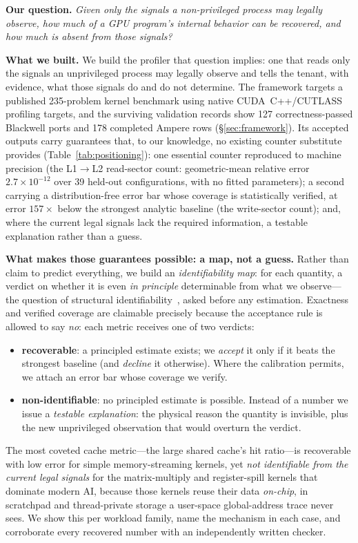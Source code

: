 \documentclass[conference]{IEEEtran}
\newcommand{\rec}{\textcolor{recblue}{\textbf{recoverable}}}
\newcommand{\non}{\textcolor{noid}{\textbf{non-identifiable}}}
\begin{document}
\smallskip
\noindent\textbf{Our question.} \emph{Given only the signals a non-privileged
process may legally observe, how much of a GPU program's internal behavior can
be recovered, and how much is absent from those signals?}

\smallskip
\noindent\textbf{What we built.} We build the profiler that question implies:
one that reads only the signals an unprivileged process may legally observe
and tells the tenant, with evidence, what those signals do and do not
determine. The framework targets a published 235-problem kernel benchmark
using native CUDA~C++/CUTLASS profiling targets, and the surviving
validation records show 127 correctness-passed Blackwell ports and 178 completed Ampere
rows (\S\ref{sec:framework}). Its accepted outputs carry guarantees that, to
our knowledge, no existing counter substitute provides (Table~\ref{tab:positioning}):
one essential counter reproduced to machine precision (the
L1$\rightarrow$L2 read-sector count: geometric-mean relative error
$2.7\times10^{-12}$ over 39 held-out configurations, with no fitted
parameters); a second carrying a distribution-free error bar whose coverage
is statistically verified, at error $157\times$ below the strongest analytic
baseline (the write-sector count); and, where the current legal signals lack
the required information, a testable explanation rather than a guess.

\smallskip
\noindent\textbf{What makes those guarantees possible: a map, not a guess.}
Rather than claim to predict
everything, we build an \emph{identifiability map}: for each quantity, a verdict
on whether it is even \emph{in principle} determinable from what we observe---the
question of structural
identifiability~\cite{villaverde2016structural}, asked
before any estimation. Exactness and verified coverage are claimable
precisely because the acceptance rule is allowed to say \emph{no}: each
metric receives one of two verdicts:
\begin{itemize}
\item \rec: a principled estimate exists; we \emph{accept} it only if it
beats the strongest baseline (and \emph{decline} it otherwise). Where the
calibration permits, we attach
an error bar whose coverage we verify.
\item \non: no principled estimate is possible. Instead of a number we issue a
\emph{testable explanation}: the physical reason the quantity is invisible, plus the
new unprivileged observation that would overturn the verdict.
\end{itemize}
The most coveted cache
metric---the large shared cache's hit ratio---is recoverable with low error for
simple memory-streaming kernels, yet \emph{not identifiable from the current legal signals} for the
matrix-multiply and register-spill kernels that dominate modern AI, because
those kernels reuse their data \emph{on-chip}, in scratchpad and
thread-private storage a user-space global-address trace never sees. We show this per workload
family, name the mechanism in each case, and corroborate every recovered number
with an independently written checker.
\end{document}
